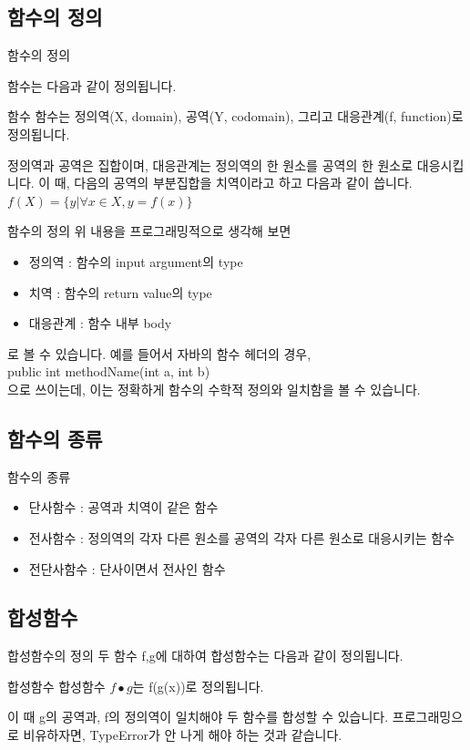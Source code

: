 \documentclass{beamer}
\begin{document}
\subsection{함수의 정의}
\begin{frame}{함수의 정의}

함수는 다음과 같이 정의됩니다. 

\begin{block}{함수}
함수는 정의역(X, domain), 공역(Y, codomain), 그리고 대응관계(f, function)로 정의됩니다. 
\end{block}

정의역과 공역은 집합이며, 대응관계는 정의역의 한 원소를 공역의 한 원소로 대응시킵니다. 이 때, 다음의 공역의 부분집합을 치역이라고 하고 다음과 같이 씁니다. 
$f(X) = \{y|\forall x \in X, y=f(x)\}$
\end{frame}

\begin{frame}{함수의 정의}
위 내용을 프로그래밍적으로 생각해 보면 
\begin{itemize}
\item 정의역 : 함수의 input argument의 type
\item 치역 : 함수의 return value의 type 
\item 대응관계 : 함수 내부 body 
\end{itemize}
로 볼 수 있습니다. 예를 들어서 자바의 함수 헤더의 경우, \\
public int methodName(int a, int b) \\
으로 쓰이는데, 이는 정확하게 함수의 수학적 정의와 일치함을 볼 수 있습니다. 
\end{frame}

\subsection{함수의 종류}
\begin{frame}{함수의 종류}
\begin{itemize}
\item 단사함수 : 공역과 치역이 같은 함수
\item 전사함수 : 정의역의 각자 다른 원소를 공역의 각자 다른 원소로 대응시키는 함수
\item 전단사함수 : 단사이면서 전사인 함수
\end{itemize}

\end{frame}

\subsection{합성함수}
\begin{frame}{합성함수의 정의}
두 함수 f,g에 대하여 합성함수는 다음과 같이 정의됩니다. 
\begin{block}{합성함수}
합성함수 $f \bullet g$는 f(g(x))로 정의됩니다. 
\end{block}
이 때 g의 공역과, f의 정의역이 일치해야 두 함수를 합성할 수 있습니다. 프로그래밍으로 비유하자면, TypeError가 안 나게 해야 하는 것과 같습니다. 

\end{frame}
\end{document}

